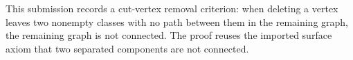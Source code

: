 This submission records a cut-vertex removal criterion: when deleting a vertex leaves
two nonempty classes with no path between them in the remaining graph, the remaining
graph is not connected. The proof reuses the imported surface axiom that two separated
components are not connected.
